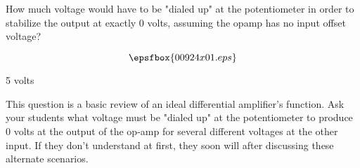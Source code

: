 

How much voltage would have to be "dialed up" at the potentiometer in order to stabilize the output at exactly 0 volts, assuming the opamp has no input offset voltage?

$$\epsfbox{00924x01.eps}$$







5 volts







This question is a basic review of an ideal differential amplifier's function.  Ask your students what voltage must be "dialed up" at the potentiometer to produce 0 volts at the output of the op-amp for several different voltages at the other input.  If they don't understand at first, they soon will after discussing these alternate scenarios.




